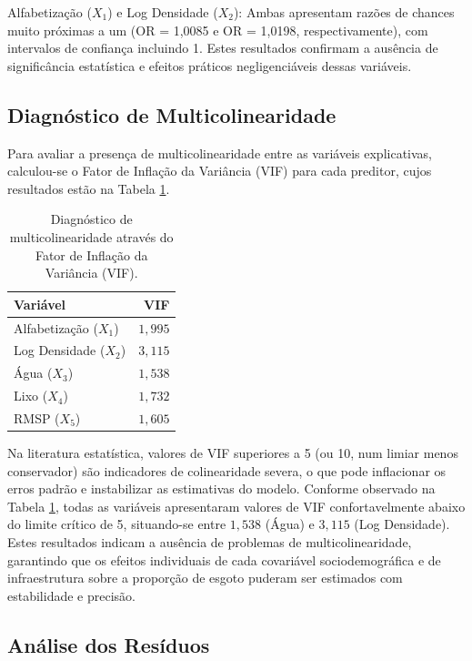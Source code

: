 \documentclass[12pt, a4paper]{article}
\begin{document}
Alfabetização ($X_1$) e Log Densidade ($X_2$): Ambas apresentam razões de chances muito próximas a um (OR = 1,0085 e OR = 1,0198, respectivamente), com intervalos de confiança incluindo 1. Estes resultados confirmam a ausência de significância estatística e efeitos práticos negligenciáveis dessas variáveis.

\subsection{Diagnóstico de Multicolinearidade}

Para avaliar a presença de multicolinearidade entre as variáveis explicativas, calculou-se o Fator de Inflação da Variância (VIF) para cada preditor, cujos resultados estão na Tabela \ref{tab:vif}.

\begin{table}[H]
\centering
\caption{Diagnóstico de multicolinearidade através do Fator de Inflação da Variância (VIF).}
\label{tab:vif}
\begin{tabular}{lr}
\toprule
\textbf{Variável} & \textbf{VIF} \\
\midrule
Alfabetização ($X_1$) & $1,995$ \\
Log Densidade ($X_2$) & $3,115$ \\
Água ($X_3$)          & $1,538$ \\
Lixo ($X_4$)          & $1,732$ \\
RMSP ($X_5$)          & $1,605$ \\
\bottomrule
\end{tabular}
\end{table}

Na literatura estatística, valores de VIF superiores a 5 (ou 10, num limiar menos conservador) são indicadores de colinearidade severa, o que pode inflacionar os erros padrão e instabilizar as estimativas do modelo. Conforme observado na Tabela \ref{tab:vif}, todas as variáveis apresentaram valores de VIF confortavelmente abaixo do limite crítico de 5, situando-se entre $1,538$ (Água) e $3,115$ (Log Densidade). Estes resultados indicam a ausência de problemas de multicolinearidade, garantindo que os efeitos individuais de cada covariável sociodemográfica e de infraestrutura sobre a proporção de esgoto puderam ser estimados com estabilidade e precisão.

\subsection{Análise dos Resíduos}
\end{document}
